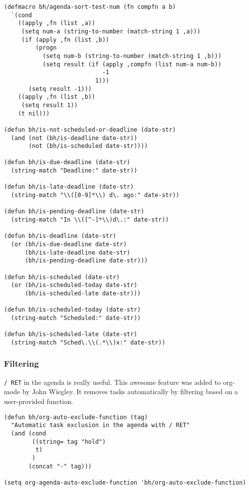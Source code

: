 \documentclass[11pt]{scrartcl}
\begin{document}
\begin{verbatim}
(defmacro bh/agenda-sort-test-num (fn compfn a b)
  `(cond
    ((apply ,fn (list ,a))
     (setq num-a (string-to-number (match-string 1 ,a)))
     (if (apply ,fn (list ,b))
         (progn
           (setq num-b (string-to-number (match-string 1 ,b)))
           (setq result (if (apply ,compfn (list num-a num-b))
                            -1
                          1)))
       (setq result -1)))
    ((apply ,fn (list ,b))
     (setq result 1))
    (t nil)))

(defun bh/is-not-scheduled-or-deadline (date-str)
  (and (not (bh/is-deadline date-str))
       (not (bh/is-scheduled date-str))))

(defun bh/is-due-deadline (date-str)
  (string-match "Deadline:" date-str))

(defun bh/is-late-deadline (date-str)
  (string-match "\\([0-9]*\\) d\. ago:" date-str))

(defun bh/is-pending-deadline (date-str)
  (string-match "In \\([^-]*\\)d\.:" date-str))

(defun bh/is-deadline (date-str)
  (or (bh/is-due-deadline date-str)
      (bh/is-late-deadline date-str)
      (bh/is-pending-deadline date-str)))

(defun bh/is-scheduled (date-str)
  (or (bh/is-scheduled-today date-str)
      (bh/is-scheduled-late date-str)))

(defun bh/is-scheduled-today (date-str)
  (string-match "Scheduled:" date-str))

(defun bh/is-scheduled-late (date-str)
  (string-match "Sched\.\\(.*\\)x:" date-str))
\end{verbatim}

\subsubsection{Filtering}
\label{sec:orgheadline10}

\texttt{/ RET} in the agenda is really useful.  This awesome feature was
added to org-mode by John Wiegley.  It removes tasks automatically by
filtering based on a user-provided function.

\begin{verbatim}
(defun bh/org-auto-exclude-function (tag)
  "Automatic task exclusion in the agenda with / RET"
  (and (cond
        ((string= tag "hold")
         t)
        )
       (concat "-" tag)))

(setq org-agenda-auto-exclude-function 'bh/org-auto-exclude-function)
\end{verbatim}
\end{document}
